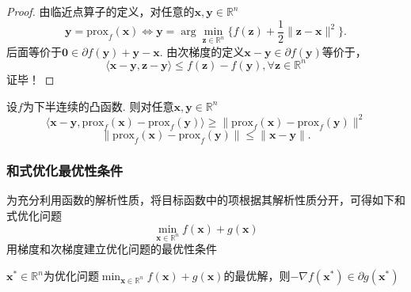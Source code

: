 \begin{proof}
    由临近点算子的定义，对任意的$\boldsymbol{x},\boldsymbol{y}\in \mathbb{R}^n$
    \[
        \boldsymbol{y}=\mathrm{prox}_{f}(\boldsymbol{x})\Longleftrightarrow \boldsymbol{y}=\arg\min_{\boldsymbol{z}\in\mathbb{R}^{n}}\{f(\boldsymbol{z})+\frac{1}{2}\|\boldsymbol{z}-\boldsymbol{x}\|^{2}\}.
    \]
    后面等价于$\boldsymbol{0}\in\partial f(\boldsymbol{y})+\boldsymbol{y}-\boldsymbol{x}.$
    由次梯度的定义$\boldsymbol{x}-\boldsymbol{y}\in\partial f(\boldsymbol{y})$等价于，
    \[
        \langle \boldsymbol{x}-\boldsymbol{y},\boldsymbol{z}-\boldsymbol{y}\rangle\leqslant f(\boldsymbol{z})-f(\boldsymbol{y}),\forall \boldsymbol{z}\in \mathbb{R}^{n}
    \]
    证毕！
\end{proof}
\begin{theorem}
   设$f$为下半连续的凸函数. 则对任意$\boldsymbol{x},\boldsymbol{y}\in \mathbb{R}^n$
   \[
        \langle\boldsymbol{x}-\boldsymbol{y},\mathrm{prox}_f(\boldsymbol{x})-\mathrm{prox}_f(\boldsymbol{y})\rangle\geqslant\|\mathrm{prox}_f(\boldsymbol{x})-\mathrm{prox}_f(\boldsymbol{y})\|^2
   \]
   \[
        \|\mathrm{prox}_f(\boldsymbol{x})-\mathrm{prox}_f(\boldsymbol{y})\|\leqslant\|\boldsymbol{x}-\boldsymbol{y}\|.
   \]
\end{theorem}
\subsubsection{和式优化最优性条件}
为充分利用函数的解析性质，将目标函数中的项根据其解析性质分开，可得如下和式优化问题
\[
    \min_{\boldsymbol{x}\in\mathbb{R}^n}f(\boldsymbol{x})+g(\boldsymbol{x})
\]
用梯度和次梯度建立优化问题的最优性条件
\begin{theorem}
    $\boldsymbol{x}^*\in\mathbb{R}^n$为优化问题$\operatorname*{min}_{\boldsymbol{x}\in\mathbb{R}^n}f(\boldsymbol{x})+g(\boldsymbol{x})$的最优解，则$-\nabla f(\boldsymbol{x}^*)\in\partial g(\boldsymbol{x}^*)$
\end{theorem}
